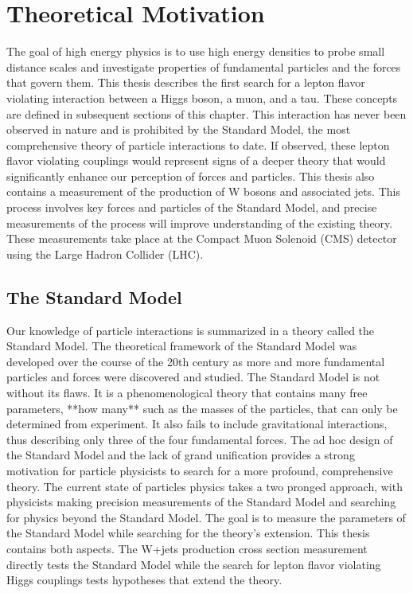 \documentclass[oneside, letterpaper, oldfontcommands]{memoir}
\begin{document}
\chapter{Theoretical Motivation}\label{theory}
\qquad The goal of high energy physics is to use high energy densities to probe small distance scales and investigate properties of fundamental particles and the forces that govern them. This thesis describes the first search for a lepton flavor violating interaction between a Higgs boson, a muon, and a tau. These concepts are defined in subsequent sections of this chapter. This interaction has never been observed in nature and is prohibited by the Standard Model, the most comprehensive theory of particle interactions to date. If observed, these lepton flavor violating couplings would represent signs of a deeper theory that would significantly enhance our perception of forces and particles. This thesis also contains a measurement of the production of W bosons and associated jets. This process involves key forces and particles of the Standard Model, and precise measurements of the process will improve understanding of the existing theory. These measurements take place at the Compact Muon Solenoid (CMS) detector using the Large Hadron Collider (LHC). 

\section{The Standard Model}\label{sm}

\qquad Our knowledge of particle interactions is summarized in a theory called the Standard Model. The theoretical framework of the Standard Model was developed over the course of the 20th century as more and more fundamental particles and forces were discovered and studied. The Standard Model is not without its flaws. It is a phenomenological theory that contains many free parameters, **how many** such as the masses of the particles, that can only be determined from experiment. It also fails to include gravitational interactions, thus describing only three of the four fundamental forces. The ad hoc design of the Standard Model and the lack of grand unification provides a strong motivation for particle physicists to search for a more profound, comprehensive theory. The current state of particles physics takes a two pronged approach, with physicists making precision measurements of the Standard Model and searching for physics beyond the Standard Model. The goal is to measure the parameters of the Standard Model while searching for the theory's extension. This thesis contains both aspects. The W+jets production cross section measurement directly tests the Standard Model while the search for lepton flavor violating Higgs couplings tests hypotheses that extend the theory.
\end{document}
